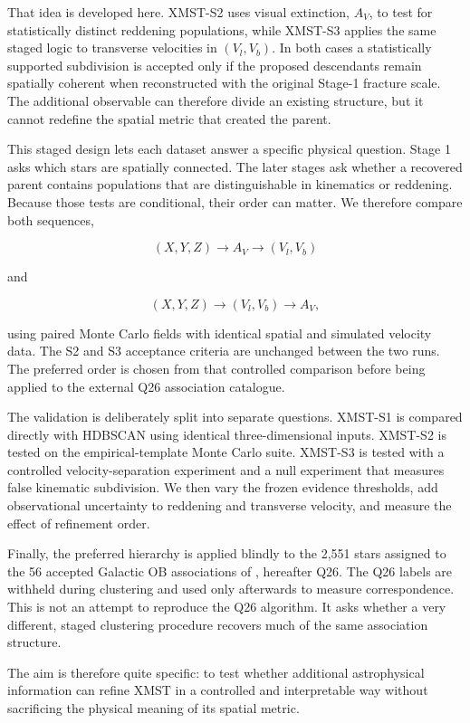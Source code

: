 \documentclass[fleqn,usenatbib]{rasti}
\begin{document}
That idea is developed here. XMST-S2 uses visual extinction, $A_V$, to test for statistically distinct reddening populations, while XMST-S3 applies the same staged logic to transverse velocities in $(V_l,V_b)$. In both cases a statistically supported subdivision is accepted only if the proposed descendants remain spatially coherent when reconstructed with the original Stage-1 fracture scale. The additional observable can therefore divide an existing structure, but it cannot redefine the spatial metric that created the parent.

This staged design lets each dataset answer a specific physical question. Stage 1 asks which stars are spatially connected. The later stages ask whether a recovered parent contains populations that are distinguishable in kinematics or reddening. Because those tests are conditional, their order can matter. We therefore compare both sequences,

\[
(X,Y,Z)\rightarrow A_V\rightarrow(V_l,V_b)
\]

and

\[
(X,Y,Z)\rightarrow(V_l,V_b)\rightarrow A_V,
\]

using paired Monte Carlo fields with identical spatial and simulated velocity data. The S2 and S3 acceptance criteria are unchanged between the two runs. The preferred order is chosen from that controlled comparison before being applied to the external Q26 association catalogue.

The validation is deliberately split into separate questions. XMST-S1 is compared directly with HDBSCAN using identical three-dimensional inputs. XMST-S2 is tested on the empirical-template Monte Carlo suite. XMST-S3 is tested with a controlled velocity-separation experiment and a null experiment that measures false kinematic subdivision. We then vary the frozen evidence thresholds, add observational uncertainty to reddening and transverse velocity, and measure the effect of refinement order.

Finally, the preferred hierarchy is applied blindly to the 2,551 stars assigned to the 56 accepted Galactic OB associations of \citet{Quintana2026}, hereafter Q26. The Q26 labels are withheld during clustering and used only afterwards to measure correspondence. This is not an attempt to reproduce the Q26 algorithm. It asks whether a very different, staged clustering procedure recovers much of the same association structure.

The aim is therefore quite specific: to test whether additional astrophysical information can refine XMST in a controlled and interpretable way without sacrificing the physical meaning of its spatial metric.
\end{document}
